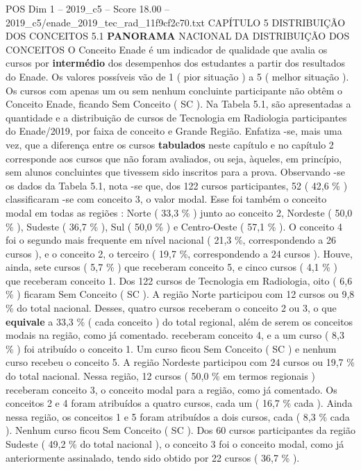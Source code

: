 \begin{textsample}{POS Dim 1 – 2019\_c5 – Score 18.00 – 2019\_c5/enade\_2019\_tec\_rad\_11f9cf2c70.txt}  \label{ex:f1_pos_048}
CAPÍTULO 5 DISTRIBUIÇÃO DOS CONCEITOS 5.1 \textbf{PANORAMA} NACIONAL DA DISTRIBUIÇÃO DOS CONCEITOS O Conceito Enade é um indicador de qualidade que avalia os cursos por \textbf{intermédio} dos desempenhos dos estudantes a partir dos resultados do Enade.
Os valores possíveis vão de 1 ( pior situação ) a 5 ( melhor situação ).
Os cursos com apenas um ou sem nenhum concluinte participante não obtêm o Conceito Enade, ficando Sem Conceito ( SC ).
Na Tabela 5.1, são apresentadas a quantidade e a distribuição de cursos de Tecnologia em Radiologia participantes do Enade/2019, por faixa de conceito e Grande Região.
Enfatiza -se, mais uma vez, que a diferença entre os cursos \textbf{tabulados} neste capítulo e no capítulo 2 corresponde aos cursos que não foram avaliados, ou seja, àqueles, em princípio, sem alunos concluintes que tivessem sido inscritos para a prova.
Observando -se os dados da Tabela 5.1, nota -se que, dos 122 cursos participantes, 52 ( 42,6 \% ) classificaram -se com conceito 3, o valor modal.
Esse foi também o conceito modal em todas as regiões : Norte ( 33,3 \% ) junto ao conceito 2, Nordeste ( 50,0 \% ), Sudeste ( 36,7 \% ), Sul ( 50,0 \% ) e Centro-Oeste ( 57,1 \% ).
O conceito 4 foi o segundo mais frequente em nível nacional ( 21,3 \%, correspondendo a 26 cursos ), e o conceito 2, o terceiro ( 19,7 \%, correspondendo a 24 cursos ).
Houve, ainda, sete cursos ( 5,7 \% ) que receberam conceito 5, e cinco cursos ( 4,1 \% ) que receberam conceito 1.
Dos 122 cursos de Tecnologia em Radiologia, oito ( 6,6 \% ) ficaram Sem Conceito ( SC ).
A região Norte participou com 12 cursos ou 9,8 \% do total nacional.
Desses, quatro cursos receberam o conceito 2 ou 3, o que \textbf{equivale} a 33,3 \% ( cada conceito ) do total regional, além de serem os conceitos modais na região, como já comentado. receberam conceito 4, e a um curso ( 8,3 \% ) foi atribuído o conceito 1.
Um curso ficou Sem Conceito ( SC ) e nenhum curso recebeu o conceito 5.
A região Nordeste participou com 24 cursos ou 19,7 \% do total nacional.
Nessa região, 12 cursos ( 50,0 \% em termos regionais ) receberam conceito 3, o conceito modal para a região, como já comentado.
Os conceitos 2 e 4 foram atribuídos a quatro cursos, cada um ( 16,7 \% cada ).
Ainda nessa região, os conceitos 1 e 5 foram atribuídos a dois cursos, cada ( 8,3 \% cada ).
Nenhum curso ficou Sem Conceito ( SC ).
Dos 60 cursos participantes da região Sudeste ( 49,2 \% do total nacional ), o conceito 3 foi o conceito modal, como já anteriormente assinalado, tendo sido obtido por 22 cursos ( 36,7 \% ).

\end{textsample}
